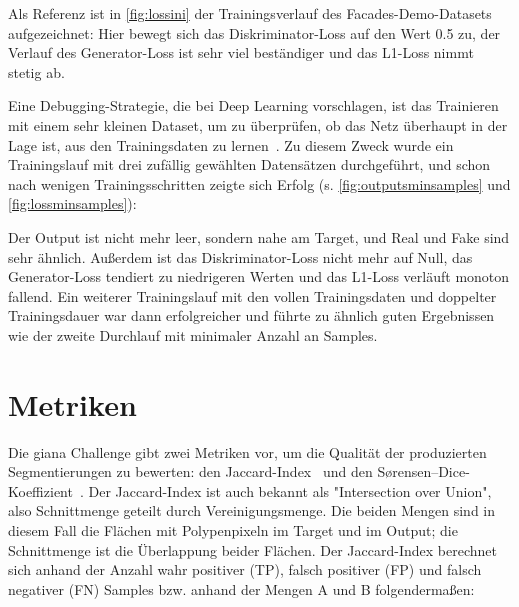

Als Referenz ist in \autoref{fig:lossini} der Trainingsverlauf des Facades-Demo-Datasets aufgezeichnet:
Hier bewegt sich das Diskriminator-Loss auf den Wert 0.5 zu, der Verlauf des Generator-Loss ist sehr viel beständiger und das L1-Loss nimmt stetig ab.

Eine Debugging-Strategie, die \citeauthor{Goodfellow.2016} bei Deep Learning vorschlagen, ist das Trainieren mit einem sehr kleinen Dataset, um zu überprüfen, ob das Netz überhaupt in der Lage ist, aus den Trainingsdaten zu lernen~\cite{Goodfellow.2016}.
Zu diesem Zweck wurde ein Trainingslauf mit drei zufällig gewählten Datensätzen durchgeführt, und schon nach wenigen Trainingsschritten zeigte sich Erfolg (s. \autoref{fig:outputsminsamples} und \autoref{fig:lossminsamples}):



Der Output ist nicht mehr leer, sondern nahe am Target, und Real und Fake sind sehr ähnlich.
Außerdem ist das Diskriminator-Loss nicht mehr auf Null, das Generator-Loss tendiert zu niedrigeren Werten und das L1-Loss verläuft monoton fallend.
Ein weiterer Trainingslauf mit den vollen Trainingsdaten und doppelter Trainingsdauer war dann erfolgreicher und führte zu ähnlich guten Ergebnissen wie der zweite Durchlauf mit minimaler Anzahl an Samples.



\section{Metriken}

Die \gls{giana} Challenge gibt zwei Metriken vor, um die Qualität der produzierten Segmentierungen zu bewerten: den Jaccard-Index~\cite{Jaccard.1901} und den Sørensen–Dice-Koeffizient~\cite{Srensen.1948,Dice.1945}.
Der Jaccard-Index ist auch bekannt als "Intersection over Union", also Schnittmenge geteilt durch Vereinigungsmenge.
Die beiden Mengen sind in diesem Fall die Flächen mit Polypenpixeln im Target und im Output; die Schnittmenge ist die Überlappung beider Flächen.
Der Jaccard-Index berechnet sich anhand der Anzahl wahr positiver (TP), falsch positiver (FP) und falsch negativer (FN) Samples bzw. anhand der Mengen A und B folgendermaßen:

